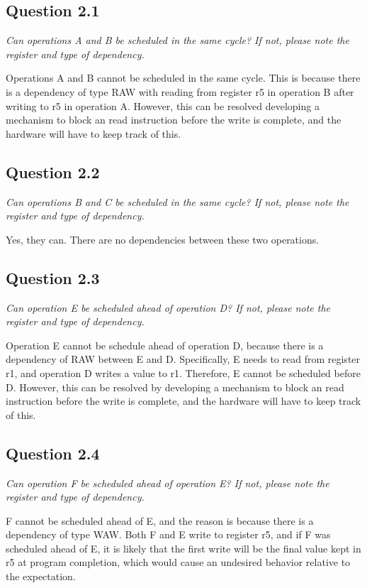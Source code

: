 \documentclass[
	letterpaper, %
]{jdf}
\begin{document}
\subsection{Question 2.1}
\textit{Can operations A and B be scheduled in the same cycle? If not, please note the register and type of dependency.}

Operations A and B cannot be scheduled in the same cycle. This is because there is a dependency of type RAW with reading from register r5 in operation B after writing to r5 in operation A. However, this can be resolved developing a mechanism to block an read instruction before the write is complete, and the hardware will have to keep track of this.

\subsection{Question 2.2}
\textit{Can operations B and C be scheduled in the same cycle? If not, please note the register and type of dependency.}

Yes, they can. There are no dependencies between these two operations.

\subsection{Question 2.3}
\textit{Can operation E be scheduled ahead of operation D? If not, please note the register and type of dependency.}

Operation E cannot be schedule ahead of operation D, because there is a dependency of RAW between E and D. Specifically, E needs to read from register r1, and operation D writes a value to r1. Therefore, E cannot be scheduled before D. However, this can be resolved by developing a mechanism to block an read instruction before the write is complete, and the hardware will have to keep track of this.

\subsection{Question 2.4}
\textit{Can operation F be scheduled ahead of operation E? If not, please note the register and type of dependency.}

F cannot be scheduled ahead of E, and the reason is because there is a dependency of type WAW. Both F and E write to register r5, and if F was scheduled ahead of E, it is likely that the first write will be the final value kept in r5 at program completion, which would cause an undesired behavior relative to the expectation.
\end{document}
